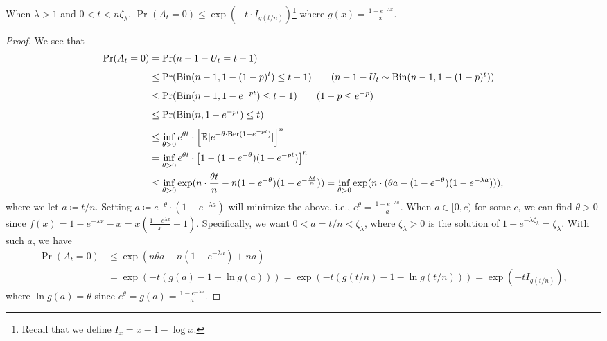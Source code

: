 \begin{lemma}\label{lma:supercritical-Erdős-Rényi-graph}
	When \(\lambda > 1\) and \(0 < t < n \zeta _{\lambda }\), \(\Pr_{}(A_t = 0) \leq \exp (-t \cdot I_{g(t / n)})\)\footnote{Recall that we define \(I_x = x - 1 - \log x\).} where \(g(x) = \frac{1 - e^{-\lambda x}}{x}\).
\end{lemma}
\begin{proof}
	We see that
	\begin{align*}
		\Pr_{}(A_t = 0)
		 & = \Pr_{}(n-1 - U_t = t-1)                                                                                                        \\
		 & \leq \Pr_{}(\operatorname{Bin}(n-1, 1 - (1 - p)^t) \leq t-1) \tag*{(\(n-1 - U_t \sim \operatorname{Bin}(n-1, 1 - (1 - p)^t)\))}  \\
		 & \leq \Pr_{}(\operatorname{Bin}(n-1, 1 - e^{-p t}) \leq t-1) \tag*{(\(1 - p \leq e^{-p}\))}                                       \\
		 & \leq \Pr_{}(\operatorname{Bin}(n, 1 - e^{-p t}) \leq t)                                                                          \\
		 & \leq \inf _{\theta  > 0} e^{\theta t} \cdot \left[ \mathbb{E}_{}[e^{-\theta \cdot \operatorname{Ber}(1 - e^{-p t}) }] \right] ^n \\
		 & = \inf _{\theta > 0} e^{\theta t} \cdot \left[ 1 - (1 - e^{-\theta } ) (1 - e^{-p t} )\right] ^n                                 \\
		 & \leq \inf _{\theta > 0} \exp (n \cdot \frac{\theta t}{n} - n (1 - e^{-\theta }) (1 - e^{- \frac{\lambda t}{n}}))
		= \inf _{\theta > 0} \exp (n \cdot (\theta a - (1 - e^{-\theta }) (1 - e^{-\lambda a}))),
	\end{align*}
	where we let \(a \coloneqq t / n\). Setting \(a \coloneqq e^{-\theta } \cdot (1 - e^{-\lambda a})\) will minimize the above, i.e., \(e^{\theta } = \frac{1 - e^{-\lambda a}}{a}\). When \(a \in [0, c)\) for some \(c\), we can find \(\theta > 0\) since \(f(x) = 1 - e^{-\lambda x} - x = x (\frac{1-e^{\lambda x}}{x} - 1)\). Specifically, we want \(0 < a = t / n < \zeta _\lambda \), where \(\zeta _\lambda > 0\) is the solution of \(1 - e^{-\lambda \zeta _\lambda } = \zeta _\lambda \). With such \(a\), we have
	\[
		\begin{split}
			\Pr_{}(A_t = 0)
			 & \leq \exp (n \theta a -  n(1 - e^{-\lambda a}) + na) \\
			 & = \exp (-t (g(a) - 1 - \ln g(a)))
			= \exp (-t (g(t / n) - 1 - \ln g(t / n)))
			= \exp (-t I_{g(t / n)}),
		\end{split}
	\]
	where \(\ln g(a) = \theta \) since \(e^\theta = g(a) = \frac{1 - e^{-\lambda a}}{a}\).
\end{proof}


